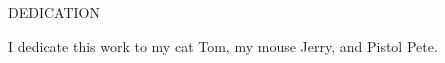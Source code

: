 \begin{center}
DEDICATION
\end{center}

I dedicate this work to my cat Tom, my mouse Jerry, and Pistol Pete.
